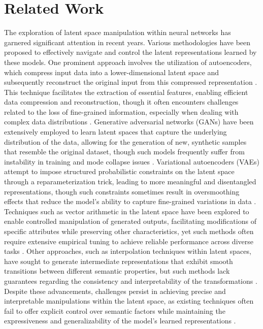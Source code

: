 \section{Related Work}
The exploration of latent space manipulation within neural networks has garnered significant attention in recent years. Various methodologies have been proposed to effectively navigate and control the latent representations learned by these models. One prominent approach involves the utilization of autoencoders, which compress input data into a lower-dimensional latent space and subsequently reconstruct the original input from this compressed representation \cite{firstova2024investigating}. This technique facilitates the extraction of essential features, enabling efficient data compression and reconstruction, though it often encounters challenges related to the loss of fine-grained information, especially when dealing with complex data distributions \cite{hilabadu2024assessment}. Generative adversarial networks (GANs) have been extensively employed to learn latent spaces that capture the underlying distribution of the data, allowing for the generation of new, synthetic samples that resemble the original dataset, though such models frequently suffer from instability in training and mode collapse issues \cite{miana2024augmentation,keith2024optimizing}. Variational autoencoders (VAEs) attempt to impose structured probabilistic constraints on the latent space through a reparameterization trick, leading to more meaningful and disentangled representations, though such constraints sometimes result in oversmoothing effects that reduce the model’s ability to capture fine-grained variations in data \cite{monota2024optimizing}. Techniques such as vector arithmetic in the latent space have been explored to enable controlled manipulation of generated outputs, facilitating modifications of specific attributes while preserving other characteristics, yet such methods often require extensive empirical tuning to achieve reliable performance across diverse tasks \cite{xiong2024integrating,carrasco2024teaching}. Other approaches, such as interpolation techniques within latent spaces, have sought to generate intermediate representations that exhibit smooth transitions between different semantic properties, but such methods lack guarantees regarding the consistency and interpretability of the transformations \cite{yanid2024computation}. Despite these advancements, challenges persist in achieving precise and interpretable manipulations within the latent space, as existing techniques often fail to offer explicit control over semantic factors while maintaining the expressiveness and generalizability of the model’s learned representations \cite{ aqadah2024adaptive}. 

